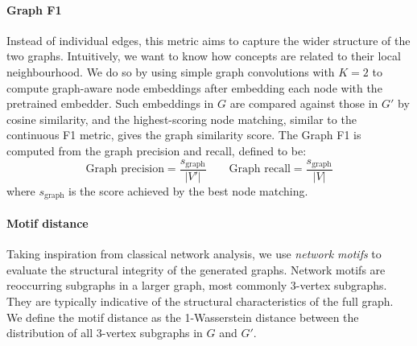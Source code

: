 \paragraph{Graph F1}
Instead of individual edges, this metric aims to capture the wider structure of the two graphs. Intuitively, we want to know how concepts are related to their local neighbourhood. We do so by using simple graph convolutions \cite{wu2019simplifying} with $K=2$ to compute graph-aware node embeddings after embedding each node with the pretrained embedder. Such embeddings in $G$ are compared against those in $G'$ by cosine similarity, and the highest-scoring node matching, similar to the continuous F1 metric, gives the graph similarity score. The Graph F1 is computed from the graph precision and recall, defined to be:
\[
    \text{Graph precision} = \frac{s_\text{graph}}{|V'|} \qquad
    \text{Graph recall} = \frac{s_\text{graph}}{|V|}
\]
where $s_\text{graph}$ is the score achieved by the best node matching.

\paragraph{Motif distance}
Taking inspiration from classical network analysis, we use \emph{network motifs} \cite{milo2002network,shen2002network} to evaluate the structural integrity of the generated graphs. Network motifs are reoccurring subgraphs in a larger graph, most commonly 3-vertex subgraphs. They are typically indicative of the structural characteristics of the full graph. We define the motif distance as the 1-Wasserstein distance between the distribution of all 3-vertex subgraphs in $G$ and $G'$.
